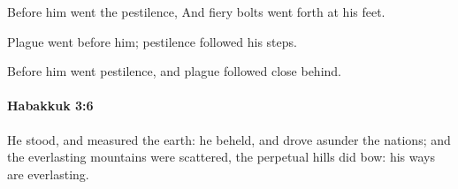 			\begin{versebox}
					\item[BHS] 
					\item[LXX] 
					\item[ASV] Before him went the pestilence, And fiery bolts went forth at his feet.
					\item[NIV] Plague went before him; pestilence followed his steps.
					\item[NRSV] Before him went pestilence, and plague followed close behind.
			\end{versebox}

		\paragraph{Habakkuk 3:6} %
			\label{HABAKKUK-3-6}

			He stood, and measured the earth: he beheld, and drove asunder the nations; and the everlasting mountains were scattered, the perpetual hills did bow: his ways are everlasting.

